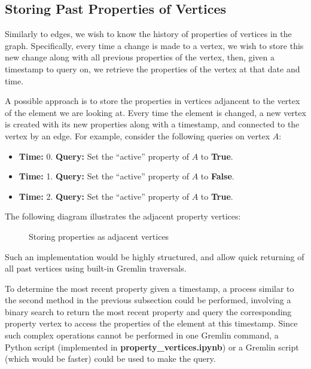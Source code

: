 \documentclass[12pt]{article}
\begin{document}
\subsection{Storing Past Properties of Vertices}

Similarly to edges, we wish to know the history of properties of vertices in the graph. Specifically, every time a change is made to a vertex, we wish to store this new change along with all previous properties of the vertex, then, given a timestamp to query on, we retrieve the properties of the vertex at that date and time. 

A possible approach is to store the properties in vertices adjancent to the vertex of the element we are looking at. Every time the element is changed, a new vertex is created with its new properties along with a timestamp, and connected to the vertex by an edge. For example, consider the following queries on vertex \(A\):

\begin{itemize}
    \item \textbf{Time:} 0. \textbf{Query:} Set the ``active'' property of \(A\) to \textbf{True}.
    \item \textbf{Time:} 1. \textbf{Query:} Set the ``active'' property of \(A\) to \textbf{False}.
    \item \textbf{Time:} 2. \textbf{Query:} Set the ``active'' property of \(A\) to \textbf{True}.
\end{itemize}

The following diagram illustrates the adjacent property vertices:
\begin{figure}[H]
    \centering
    \fontsize{10pt}{20pt}\selectfont
    \def\svgwidth{4in}
    
    \caption{Storing properties as adjacent vertices}
\end{figure}

Such an implementation would be highly structured, and allow quick returning of all past vertices using built-in Gremlin traversals. 

To determine the most recent property given a timestamp, a process similar to the second method in the previous subsection could be performed, involving a binary search to return the most recent property and query the corresponding property vertex to access the properties of the element at this timestamp. Since such complex operations cannot be performed in one Gremlin command, a Python script (implemented in \textbf{property\_vertices.ipynb}) or a Gremlin script (which would be faster) could be used to make the query. 
\end{document}
